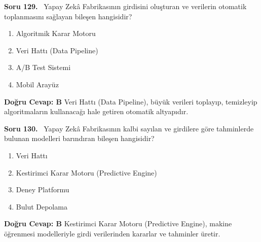 \documentclass[11pt,a4paper,openany]{book}
\begin{document}
\needspace{5cm}
\vspace{8pt}
\noindent\textbf{\large\sffamily Soru 129.} \ Yapay Zekâ Fabrikasının girdisini oluşturan ve verilerin otomatik toplanmasını sağlayan bileşen hangisidir?
\begin{enumerate}[label=\Alph*), leftmargin=25pt, topsep=4pt, itemsep=2pt]
    \item Algoritmik Karar Motoru
    \item Veri Hattı (Data Pipeline)
    \item A/B Test Sistemi
    \item Mobil Arayüz
\end{enumerate}
\vspace{4pt}
\begin{tcolorbox}[title=Cevap ve Açıklama, colback=gray!3!white, colframe=primarycolor!90!black, arc=2mm, fonttitle=\bfseries\sffamily, top=6pt, bottom=6pt]
    \textbf{Doğru Cevap: B}
    \vspace{2pt}
    Veri Hattı (Data Pipeline), büyük verileri toplayıp, temizleyip algoritmaların kullanacağı hale getiren otomatik altyapıdır.
\end{tcolorbox}
\vspace{10pt}

\needspace{5cm}
\vspace{8pt}
\noindent\textbf{\large\sffamily Soru 130.} \ Yapay Zekâ Fabrikasının kalbi sayılan ve girdilere göre tahminlerde bulunan modelleri barındıran bileşen hangisidir?
\begin{enumerate}[label=\Alph*), leftmargin=25pt, topsep=4pt, itemsep=2pt]
    \item Veri Hattı
    \item Kestirimci Karar Motoru (Predictive Engine)
    \item Deney Platformu
    \item Bulut Depolama
\end{enumerate}
\vspace{4pt}
\begin{tcolorbox}[title=Cevap ve Açıklama, colback=gray!3!white, colframe=primarycolor!90!black, arc=2mm, fonttitle=\bfseries\sffamily, top=6pt, bottom=6pt]
    \textbf{Doğru Cevap: B}
    \vspace{2pt}
    Kestirimci Karar Motoru (Predictive Engine), makine öğrenmesi modelleriyle girdi verilerinden kararlar ve tahminler üretir.
\end{tcolorbox}
\vspace{10pt}
\end{document}
